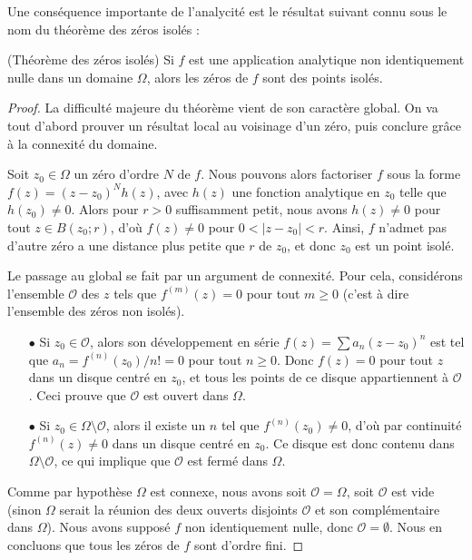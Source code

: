 Une conséquence importante de l'analycité est le résultat suivant connu sous le nom du théorème des zéros isolés :
\begin{fthm}(Théorème des zéros isolés)
Si $f$ est une application analytique non identiquement nulle dans un domaine
$\Omega$, alors les zéros de $f$ sont des points isolés.
\end{fthm}
\begin{proof}
La difficulté majeure du théorème vient de son caractère global. On va tout
d'abord prouver un résultat local au voisinage d'un zéro, puis conclure grâce à la connexité du domaine. 

Soit $z_0 \in \Omega$ un zéro d'ordre $N$ de $f$. Nous pouvons alors factoriser $f$ sous la forme $f(z)=(z-z_0)^N h(z)$, avec $h(z)$ une fonction analytique en $z_0$ telle que $h(z_0) \neq 0$. Alors pour $r>0$ suffisamment petit, nous avons $h(z) \neq 0$ pour tout $z \in B(z_0 ;r)$, d'où $f(z) \neq 0$ pour $0 < \lvert z-z_0 \rvert <r$. Ainsi, $f$ n'admet pas d'autre zéro a une distance plus petite que $r$ de $z_0$, et donc $z_0$ est un point isolé.

Le passage au global se fait par un argument de connexité. Pour cela, considérons l'ensemble $\mathcal{O}$ des $z$ tels que $f^{(m)}(z)=0$ pour tout $m \geq 0$ (c'est à dire l'ensemble des zéros non isolés).
\begin{itemize}
    \item[$\bullet$] Si $z_0 \in \mathcal{O}$, alors son développement en série $f(z)=\sum a_n (z-z_0)^n$ est tel que $a_n=f^{(n)}(z_0)/n!=0$ pour tout $n \geq 0$. Donc $f(z)=0$ pour tout $z$ dans un disque centré en $z_0$, et tous les points de ce disque appartiennent à $\mathcal{O}$. Ceci prouve que $\mathcal{O}$ est ouvert dans $\Omega$.
    \item[$\bullet$] Si $z_0 \in \Omega \setminus \mathcal{O}$, alors il existe un $n$ tel que $f^{(n)}(z_0) \neq 0$, d'où par continuité $f^{(n)}(z) \neq 0$ dans un disque centré en $z_0$. Ce disque est donc contenu dans $\Omega \setminus \mathcal{O}$, ce qui implique que $\mathcal{O}$ est fermé dans $\Omega$.
\end{itemize}
Comme par hypothèse $\Omega$ est connexe, nous avons soit $\mathcal{O}=\Omega$, soit $\mathcal{O}$ est vide (sinon $\Omega$ serait la réunion des deux ouverts disjoints $\mathcal{O}$ et son complémentaire dans $\Omega$). Nous avons supposé $f$ non identiquement nulle, donc $\mathcal{O}=\emptyset$. Nous en concluons que tous les zéros de $f$ sont d'ordre fini.
\end{proof}

